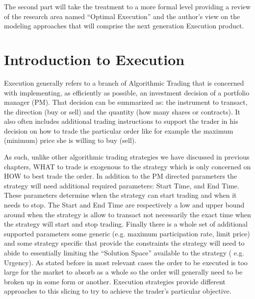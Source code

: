 The second part will take the treatment to a more formal level providing a review of  the research area named ``Optimal Execution'' and the author's view on the modeling approaches that will comprise the next generation Execution product.

\section{Introduction to Execution}

Execution generally refers to a branch of Algorithmic Trading that is concerned with  implementing, as efficiently as possible, an investment decision of a portfolio manager (PM). That decision can be summarized as: the instrument to transact, the direction (buy or sell) and the quantity (how many shares or contracts). It also often includes additional trading instructions to support the trader in his decision on how to trade the particular order like for example the maximum (minimum) price she is willing to buy (sell). 

As such, unlike other algorithmic trading strategies we have discussed in previous chapters, WHAT to trade is exogenous to the strategy which is only concerned on HOW to best trade the order. In addition to the PM directed parameters the strategy will need additional  required parameters: Start Time, and End Time. These parameters determine when the strategy can start trading and when it needs to stop. The Start and End Time are respectively a low and upper bound around when the strategy is allow to transact not necessarily the exact time when the strategy will start and stop trading. Finally there is a whole set of additional supported parameters some generic (e.g. maximum participation rate, limit price) and some strategy specific that provide the constraints the strategy will need to abide to essentially limiting the ``Solution Space'' available to the strategy ( e.g. Urgency).
As stated before in most relevant cases the order to be executed is too large for the market to absorb as a whole so the order will generally need to be broken up in some form or another. Execution strategies provide different approaches to this slicing to try to achieve the trader's particular objective.\\

